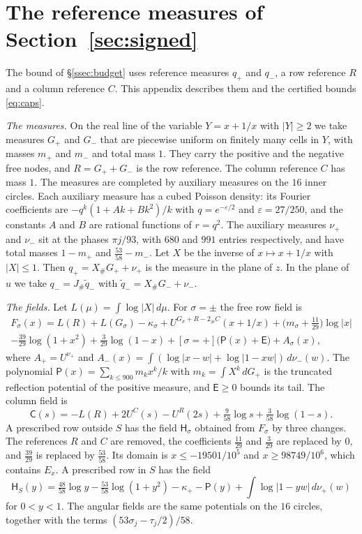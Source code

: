 \documentclass[11pt]{amsart}
\theoremstyle{definition}
\theoremstyle{remark}
\numberwithin{equation}{section}
\begin{document}
\section{The reference measures of Section~\ref{sec:signed}}\label{app:trials}

The bound of \S\ref{ssec:budget} uses reference measures $q_+$ and $q_-$, a row reference $R$ and a column reference $C$.
This appendix describes them and the certified bounds \eqref{eq:caps}.

\emph{The measures.} On the real line of the variable $Y=x+1/x$ with $|Y|\ge2$ we take measures $G_+$ and $G_-$ that
are piecewise uniform on finitely many cells in $Y$, with masses $m_+$ and $m_-$ and total mass $1$. They carry the positive and the
negative free nodes, and $R=G_++G_-$ is the row reference. The column reference $C$ has mass $1$. The measures are completed by
auxiliary measures on the $16$ inner circles. Each auxiliary measure has a cubed Poisson density: its Fourier coefficients
are $-q^k(1+Ak+Bk^2)/k$ with $q=e^{-\varepsilon/2}$ and $\varepsilon=27/250$, and the constants $A$ and $B$ are rational functions of $r=q^2$.
The auxiliary measures $\nu_+$ and $\nu_-$ sit at the phases $\pi j/93$, with $680$ and $991$ entries respectively, and have total masses $1-m_+$ and $\frac{53}{58}-m_-$. Let $X$ be the inverse of $x\mapsto x+1/x$ with $|X|\le1$. Then
$q_+=X_\#G_++\nu_+$ is the measure in the plane of $z$. In the plane of $u$ we take $q_-=J_\#\tilde q_-$ with $\tilde q_-=X_\#G_-+\nu_-$.

\emph{The fields.} Let $L(\mu)=\int\log|X|\,d\mu$. For $\sigma=\pm$ the free row field is
\begin{multline*}
 F_\sigma(x)=L(R)+L(G_\sigma)-\kappa_\sigma+U^{G_\sigma+R-2_\#C}(x+1/x)+\bigl(m_\sigma+\tfrac{11}{29}\bigr)\log|x|\\
 -\tfrac{39}{29}\log(1+x^2)+\tfrac3{29}\log(1-x)+[\sigma=+]\bigl(\mathsf P(x)+\mathsf E\bigr)+A_\sigma(x),
\end{multline*}
where $A_+=U^{\nu_+}$ and $A_-(x)=\int(\log|x-w|+\log|1-xw|)\,d\nu_-(w)$. The polynomial $\mathsf P(x)=\sum_{k\le900}m_kx^k/k$ with $m_k=\int X^k\,dG_+$ is
the truncated reflection potential of the positive measure, and $\mathsf E\ge0$ bounds its tail.
The column field is
\[
 \mathsf C(s)=-L(R)+2U^C(s)-U^R(2s)+\tfrac9{58}\log s+\tfrac3{58}\log(1-s).
\]
A prescribed row outside $S$ has the field $\mathsf H_\sigma$ obtained from $F_\sigma$ by three changes. The references $R$ and $C$ are removed, the
coefficients $\frac{11}{29}$ and $\frac3{29}$ are replaced by $0$, and $\frac{39}{29}$ is replaced by $\frac{53}{58}$. Its domain is
$x\le-19501/10^5$ and $x\ge98749/10^6$, which contains $E_x$. A prescribed row in $S$ has the field
\[
 \mathsf H_S(y)=\tfrac{48}{58}\log y-\tfrac{53}{58}\log(1+y^2)-\kappa_+-\mathsf P(y)+\int\log|1-yw|\,d\nu_+(w)
\]
for $0<y<1$.
The angular fields are the same potentials on the $16$ circles, together with the terms $(53\sigma_j-\tau_j/2)/58$.
\end{document}
